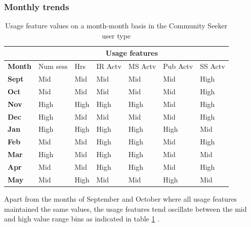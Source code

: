 \documentclass{acm_proc_article-sp}
\begin{document}
\subsubsection{Monthly trends}
\begin{table}
\caption{Usage feature values on a month-month basis in the Community Seeker user type}
\label{cluster2month}
\begin{tabular}{|p{1.5cm}|p{0.6cm}|p{0.6cm}|p{0.6cm}|p{0.6cm}|p{0.8cm}|p{0.8cm}|}
\hline
& \multicolumn{6}{c|}{\textbf{Usage features}}  \\ \hline
 \textbf{Month} 
 & Num sess & Hrs & IR Actv & MS Actv & Pub Actv & SS Actv \\ \hline
\textbf{Sept} & Mid                                    & Mid   & Mid         & Mid             & Mid            & High              \\  \hline 
\textbf{Oct}   & Mid                                    & Mid   & Mid         & Mid             & Mid            & High               \\  \hline 
\textbf{Nov}  & High                                   & High  & High        & High            & Mid            & High              \\  \hline 
\textbf{Dec}  & High                                   & Mid   & Mid         & Mid             & Mid            & High            \\  \hline 
\textbf{Jan}   & High                                   & High  & High        & High            & High           & Mid                 \\  \hline 
\textbf{Feb}  & Mid                                    & Mid   & High        & High            & Mid            & High                 \\  \hline 
\textbf{Mar}     & High                                   & Mid   & High        & High            & Mid            & Mid                 \\  \hline 
\textbf{Apr}     & Mid                                    & Mid   & High        & High            & Mid            & High                \\  \hline 
\textbf{May}       & Mid                                    & High  & Mid         & Mid             & High           & Mid           \\  \hline       
\end{tabular}
\end{table}
Apart from the months of September and October where all usage features maintained the same values, the usage features tend oscillate between the mid and high value range bins as indicated in table \ref{cluster2month} .
\end{document}
